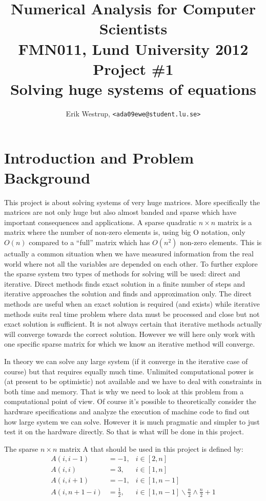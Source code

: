\documentclass[10pt, a4paper]{article}
\title{Numerical Analysis for Computer Scientists\\ FMN011, Lund University 2012\\ Project \#1\\ Solving huge systems of equations}
\date{}
\author{Erik Westrup, \texttt{<ada09ewe@student.lu.se>}}
\begin{document}
\begin{titlepage}
\maketitle

\thispagestyle{empty}
\end{titlepage}
\setcounter{page}{2}

\section{Introduction and Problem Background}
This project is about solving systems of very huge matrices. More specifically the matrices are not only huge but also almost banded and sparse which have important consequences and applications. A sparse quadratic $n\times n$  matrix is a matrix where the number of non-zero elements is, using big O notation, only $O(n)$ compared to a ``full'' matrix which has $O(n^2)$ non-zero elements. This is actually a common situation when we have measured information from the real world where not all the variables are depended on each other. To further explore the sparse system two types of methods for solving will be used: direct and iterative. Direct methods finds exact solution in a finite number of steps and iterative approaches the solution and finds and approximation only. The direct methods are useful when an exact solution is required (and exists) while iterative methods suits real time problem where data must be processed and close but not exact solution is sufficient. It is not always certain that iterative methods actually will converge towards the correct solution. However we will here only work with one specific sparse matrix for which we know an iterative method will converge.

In theory we can solve any large system (if it converge in the iterative case of course) but that requires equally much time. Unlimited computational power is (at present to be optimistic) not available and we have to deal with constraints in both time and memory. That is why we need to look at this problem from a computational point of view. Of course it's possible to theoretically consider the hardware specifications and analyze the execution of machine code to find out how large system we can solve. However it is much pragmatic and simpler to just test it on the hardware directly. So that is what will be done in this project.

The sparse $n \times n$ matrix A that should be used in this project is defined by:
\begin{eqnarray} \label{matrix+a}
		A(i,i-1)   & =	-1, & i\in[2,n] \nonumber \\
		A(i,i)	   & =	3, & i\in[1,n] \nonumber \\
		A(i,i+1)   & =	-1, & i\in[1,n-1] \nonumber \\
		A(i,n+1-i) & =	\frac{1}{2}, & i\in[1,n-1]\backslash \frac{n}{2}\wedge\frac{n}{2}+1
\end{eqnarray}
\end{document}
